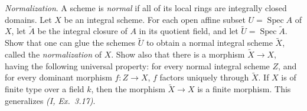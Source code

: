 \documentclass[10pt]{article}
\theoremstyle{definition}
\theoremstyle{remark}
\numberwithin{equation}{section}
\numberwithin{figure}{subsubsection}
\DeclareMathOperator{\Spec}{Spec}
\begin{document}
\begin{problem}
  \emph{Normalization}. A scheme is \emph{normal} if all of its local rings are integrally closed domains. Let $X$ be an integral scheme. For each open affine subset $U = \Spec A$ of $X$, let $\tilde{A}$ be the integral closure of $A$ in its quotient field, and let $\tilde{U} = \Spec \tilde{A}$. Show that one can glue the schemes $\tilde{U}$ to obtain a normal integral scheme $\tilde{X}$, called the \emph{normalization} of $X$. Show also that there is a morphism $\tilde{X} \to X$, having the following universal property: for every normal integral scheme $Z$, and for every dominant morphism $f\colon Z \to X$, $f$ factors uniquely through $\tilde{X}$. If $X$ is of finite type over a field $k$, then the morphism $\tilde{X} \to X$ is a finite morphism. This generalizes \emph{(I, Ex.~3.17)}.
\end{problem}
\end{document}

